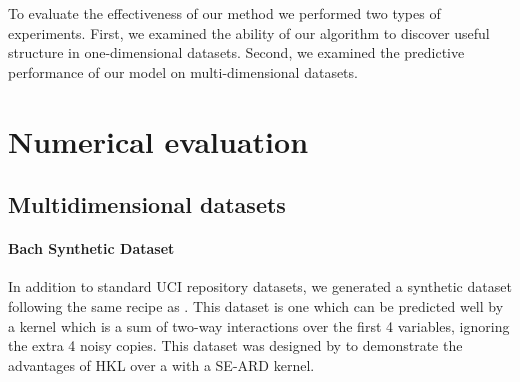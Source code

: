 \documentclass[twoside]{article}
\begin{document}
To evaluate the effectiveness of our method we performed two types of experiments.
First, we examined the ability of our algorithm to discover useful structure in one-dimensional datasets.  Second, we examined the predictive performance of our model on multi-dimensional datasets.

\section{Numerical evaluation}

\subsection{Multidimensional datasets}

\paragraph{Bach Synthetic Dataset}
In addition to standard UCI repository datasets, we generated a synthetic dataset following the same recipe as \cite{DBLP:journals/corr/abs-0909-0844}.
This dataset is one which can be predicted well by a kernel which is a sum of two-way interactions over the first 4 variables, ignoring the extra 4 noisy copies.
%
This dataset was designed by \cite{DBLP:journals/corr/abs-0909-0844} to demonstrate the advantages of HKL over a \gp{} with a SE-ARD kernel. 

\end{document}
